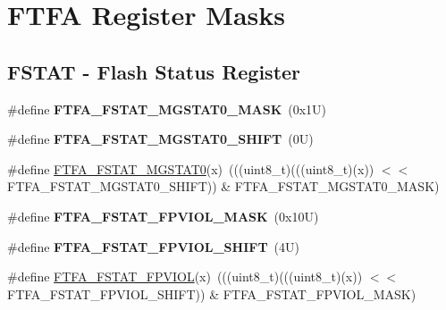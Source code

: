 \hypertarget{group___f_t_f_a___register___masks}{}\section{F\+T\+FA Register Masks}
\label{group___f_t_f_a___register___masks}
\subsection*{F\+S\+T\+AT -\/ Flash Status Register}
\begin{DoxyCompactItemize}
\item 
\mbox{\label{group___f_t_f_a___register___masks_ga56163f418850b05a9fb528e94bbc026e}} 
\#define {\bfseries F\+T\+F\+A\+\_\+\+F\+S\+T\+A\+T\+\_\+\+M\+G\+S\+T\+A\+T0\+\_\+\+M\+A\+SK}~(0x1\+U)
\item 
\mbox{\label{group___f_t_f_a___register___masks_ga61b25328b4e91259c518051ad485c9e1}} 
\#define {\bfseries F\+T\+F\+A\+\_\+\+F\+S\+T\+A\+T\+\_\+\+M\+G\+S\+T\+A\+T0\+\_\+\+S\+H\+I\+FT}~(0\+U)
\item 
\#define \mbox{\hyperlink{group___f_t_f_a___register___masks_ga03bbe63ad266bfea72963f1d727b4875}{F\+T\+F\+A\+\_\+\+F\+S\+T\+A\+T\+\_\+\+M\+G\+S\+T\+A\+T0}}(x)~(((uint8\+\_\+t)(((uint8\+\_\+t)(x)) $<$$<$ F\+T\+F\+A\+\_\+\+F\+S\+T\+A\+T\+\_\+\+M\+G\+S\+T\+A\+T0\+\_\+\+S\+H\+I\+FT)) \& F\+T\+F\+A\+\_\+\+F\+S\+T\+A\+T\+\_\+\+M\+G\+S\+T\+A\+T0\+\_\+\+M\+A\+SK)
\item 
\mbox{\label{group___f_t_f_a___register___masks_ga371bc7284b6d2e14f852e4e7e0316fef}} 
\#define {\bfseries F\+T\+F\+A\+\_\+\+F\+S\+T\+A\+T\+\_\+\+F\+P\+V\+I\+O\+L\+\_\+\+M\+A\+SK}~(0x10\+U)
\item 
\mbox{\label{group___f_t_f_a___register___masks_ga92718795ccbab208784ed798d252567e}} 
\#define {\bfseries F\+T\+F\+A\+\_\+\+F\+S\+T\+A\+T\+\_\+\+F\+P\+V\+I\+O\+L\+\_\+\+S\+H\+I\+FT}~(4\+U)
\item 
\#define \mbox{\hyperlink{group___f_t_f_a___register___masks_gae915820b296a5c150fc3cae98fa95249}{F\+T\+F\+A\+\_\+\+F\+S\+T\+A\+T\+\_\+\+F\+P\+V\+I\+OL}}(x)~(((uint8\+\_\+t)(((uint8\+\_\+t)(x)) $<$$<$ F\+T\+F\+A\+\_\+\+F\+S\+T\+A\+T\+\_\+\+F\+P\+V\+I\+O\+L\+\_\+\+S\+H\+I\+FT)) \& F\+T\+F\+A\+\_\+\+F\+S\+T\+A\+T\+\_\+\+F\+P\+V\+I\+O\+L\+\_\+\+M\+A\+SK)

\end{DoxyCompactItemize}
